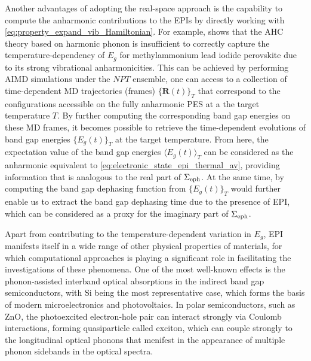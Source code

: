 Another advantages of adopting the real-space approach is the capability to compute the anharmonic contributions to the EPIs by directly working with \cref{eq:property_expand_vib_Hamiltonian}. For example, \citet{saidi2016temperature} shows that the AHC theory based on harmonic phonon is insufficient to correctly capture the temperature-dependency of $E_{g}$ for  methylammonium lead iodide perovskite due to its strong vibrational anharmonicities. This can be achieved by performing AIMD simulations under the $NPT$ ensemble, one can access to a collection of time-dependent MD trajectories (frames) $\{\bm{R}(t)\}_T$ that correspond to the  configurations accessible on the fully anharmonic PES at a the target temperature $T$. By further computing the corresponding band gap energies on these MD frames, it becomes possible to retrieve the time-dependent evolutions of band gap energies $\{E_{g}(t)\}_T$ at the target temperature. From here, the expectation value of the band gap energies $\langle E_g(t)\rangle_T$ can be considered as the anharmonic equivalent to \cref{eq:electronic_state_epi_thermal_av}, providing information that is analogous to the real part of $\Sigma_{\mbox{\scriptsize{eph}}}$. At the same time, by computing the band gap dephasing function from $\{E_{g}(t)\}_T$ would further enable us to extract the band gap dephasing time due to the presence of EPI, which can be considered as a proxy for the imaginary part of $\Sigma_{\mbox{\scriptsize{eph}}}$.\cite{yang2020correlating,li2018time,li2019anharmonicity,hwang2004analysis}  

Apart from contributing to the temperature-dependent variation in $E_g$, EPI manifests itself in a wide range of other physical properties of materials, for which computational approaches is playing a significant role in facilitating the investigations of these phenomena. One of the most well-known effects is the phonon-assisted interband optical absorptions in the indirect band gap semiconductors, with Si being the most representative case,\cite{noffsinger2012phonon} which forms the basis of modern microelectronics and photovoltaics. In polar semiconductors, such as ZnO,\cite{teke2004excitonic} the photoexcited electron-hole pair can interact strongly via Coulomb interactions, forming quasiparticle called exciton, which can couple strongly to the longitudinal optical phonons that menifest in the appearance of multiple phonon sidebands in the optical spectra.

